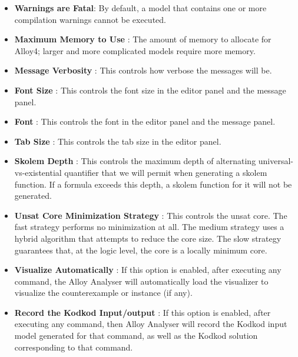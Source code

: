 \documentclass[a4paper,12pt]{extarticle}
\begin{document}
{\begin{itemize}
If you require faster performance, you can try one of the native solver such as MiniSat or ZChaff. But if MiniSat or ZChaff crashes due to platform or operating system incompatibility, then change the solver back to SAT4J.\cite{DanielJackson}
\item \textbf{Warnings are Fatal}: By default, a model that contains one or more compilation warnings cannot be executed.
\item \textbf{Maximum Memory to Use} : The amount of memory to allocate for Alloy4; larger and more complicated models require more memory.
\item \textbf{Message Verbosity} : This controls how verbose the messages will be.
\item \textbf{Font Size} : This controls the font size in the editor panel and the message panel.
\item \textbf{Font} : This controls the font in the editor panel and the message panel.
\item \textbf{Tab Size} : This controls the tab size in the editor panel.
\item \textbf{Skolem Depth} : This controls the maximum depth of alternating universal-vs-existential quantifier that we will permit when generating a skolem function. If a formula exceeds this depth, a skolem function for it will not be generated.\cite{DanielJackson}
\item \textbf{Unsat Core Minimization Strategy} : This controls the unsat core. The fast strategy performs no minimization at all. The medium strategy uses a hybrid algorithm that attempts to reduce the core size. The slow strategy guarantees that, at the logic level, the core is a locally minimum core.\cite{DanielJackson}
\item \textbf{Visualize Automatically} : If this option is enabled, after executing any command, the Alloy Analyser will automatically load the visualizer to visualize the counterexample or instance (if any).\cite{DanielJackson}
\item \textbf{Record the Kodkod Input/output} : If this option is enabled, after executing any command, then Alloy Analyser will record the Kodkod input model generated for that command, as well as the Kodkod solution corresponding to that command.\cite{DanielJackson}
\end{itemize}}
\end{document}
